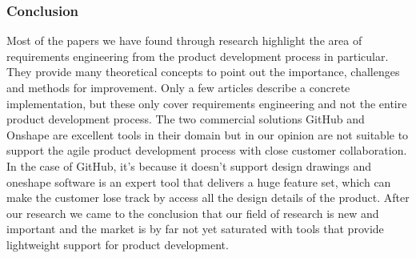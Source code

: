     \subsubsection*{Conclusion}
    Most of the papers we have found through research highlight the area of requirements engineering from the product development process in particular. They provide many theoretical concepts to point out the importance, challenges and methods for improvement. Only a few articles describe a concrete implementation, but these only cover requirements engineering and not the entire product development process. The two commercial solutions GitHub and Onshape are excellent tools in their domain but in our opinion are not suitable to support the agile product development process with close customer collaboration. In the case of GitHub, it's because it doesn't support design drawings and oneshape software is an expert tool that delivers a huge feature set, which can make the customer lose track by access all the design details of the product. After our research we came to the conclusion that our field of research is new and important and the market is by far not yet saturated with tools that provide lightweight support for product development.

